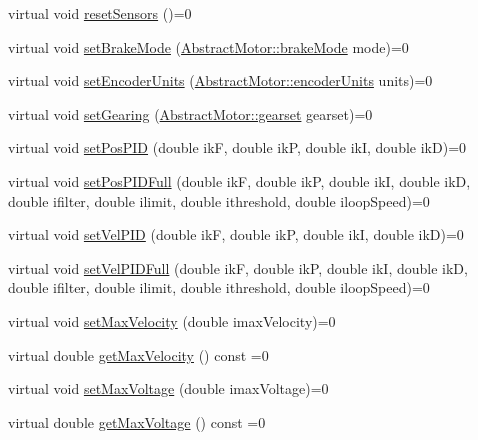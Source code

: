 \begin{DoxyCompactItemize}
virtual void \mbox{\hyperlink{classokapi_1_1ChassisModel_a6bd7e6bb60d41d3f1f5a5a129acfe1b6}{reset\+Sensors}} ()=0
\item 
virtual void \mbox{\hyperlink{classokapi_1_1ChassisModel_a20e3cde96d536e6c722aa5686e5cc8e8}{set\+Brake\+Mode}} (\mbox{\hyperlink{classokapi_1_1AbstractMotor_a132e0485dbb59a60c3f934338d8fa601}{Abstract\+Motor\+::brake\+Mode}} mode)=0
\item 
virtual void \mbox{\hyperlink{classokapi_1_1ChassisModel_ae8ba9a72bf827af4c6feffaac99b33ee}{set\+Encoder\+Units}} (\mbox{\hyperlink{classokapi_1_1AbstractMotor_ae811cd825099f2defadeb1b7f7e7764c}{Abstract\+Motor\+::encoder\+Units}} units)=0
\item 
virtual void \mbox{\hyperlink{classokapi_1_1ChassisModel_a960d6ce2f21e5832fce1d7566408cb61}{set\+Gearing}} (\mbox{\hyperlink{classokapi_1_1AbstractMotor_a88aaa6ea2fa10f5520a537bbf26774d5}{Abstract\+Motor\+::gearset}} gearset)=0
\item 
virtual void \mbox{\hyperlink{classokapi_1_1ChassisModel_a9743f82c90635ae7fc9a21d65509ba9b}{set\+Pos\+P\+ID}} (double ikF, double ikP, double ikI, double ikD)=0
\item 
virtual void \mbox{\hyperlink{classokapi_1_1ChassisModel_ab45d282450fcf9efebae6a215bd6d410}{set\+Pos\+P\+I\+D\+Full}} (double ikF, double ikP, double ikI, double ikD, double ifilter, double ilimit, double ithreshold, double iloop\+Speed)=0
\item 
virtual void \mbox{\hyperlink{classokapi_1_1ChassisModel_ae47b2c71b8492dac8c6ae64f1cf36d22}{set\+Vel\+P\+ID}} (double ikF, double ikP, double ikI, double ikD)=0
\item 
virtual void \mbox{\hyperlink{classokapi_1_1ChassisModel_a01f72f1761683c82a04643adb5f1d270}{set\+Vel\+P\+I\+D\+Full}} (double ikF, double ikP, double ikI, double ikD, double ifilter, double ilimit, double ithreshold, double iloop\+Speed)=0
\item 
virtual void \mbox{\hyperlink{classokapi_1_1ChassisModel_ae7fcb4cc95fdd7fd3c8f8388b4a698b2}{set\+Max\+Velocity}} (double imax\+Velocity)=0
\item 
virtual double \mbox{\hyperlink{classokapi_1_1ChassisModel_ab45dd7430636ed1c1dee25dae6df5d46}{get\+Max\+Velocity}} () const =0
\item 
virtual void \mbox{\hyperlink{classokapi_1_1ChassisModel_a2fb261636b79e118f22530cc3fce4f41}{set\+Max\+Voltage}} (double imax\+Voltage)=0
\item 
virtual double \mbox{\hyperlink{classokapi_1_1ChassisModel_a3ced2121524ae523592db64733c69472}{get\+Max\+Voltage}} () const =0
\end{DoxyCompactItemize}


